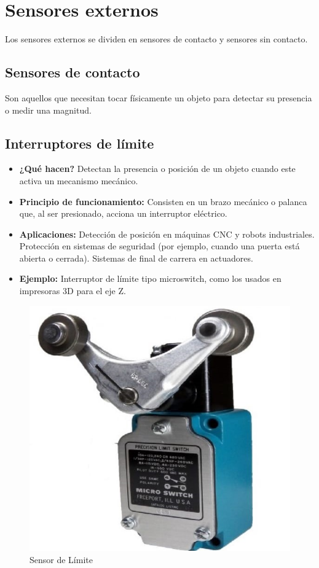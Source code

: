 \section{Sensores externos} \label{sec:sensores ecternos}
Los sensores externos se dividen en sensores de contacto y sensores sin contacto. 
\subsection{Sensores de contacto}
Son aquellos que necesitan tocar físicamente un objeto para detectar su presencia o medir una magnitud.

\subsection*{Interruptores de límite}
\begin{itemize}
	\item \textbf{¿Qué hacen?} Detectan la presencia o posición de un objeto cuando este activa un mecanismo mecánico.
	\item \textbf{Principio de funcionamiento:} Consisten en un brazo mecánico o palanca que, al ser presionado, acciona un interruptor eléctrico.
	\item \textbf{Aplicaciones:} Detección de posición en máquinas CNC y robots industriales.
	Protección en sistemas de seguridad (por ejemplo, cuando una puerta está abierta o cerrada).
	Sistemas de final de carrera en actuadores.
	\item \textbf{Ejemplo:} Interruptor de límite tipo microswitch, como los usados en impresoras 3D para el eje Z.
\end{itemize}
\begin{figure}[h]
	\centering
	\includegraphics[width=0.3\linewidth]{img/sensor de limite}
	\caption{Sensor de Límite}
	\label{fig:sensor de limite}
\end{figure}

